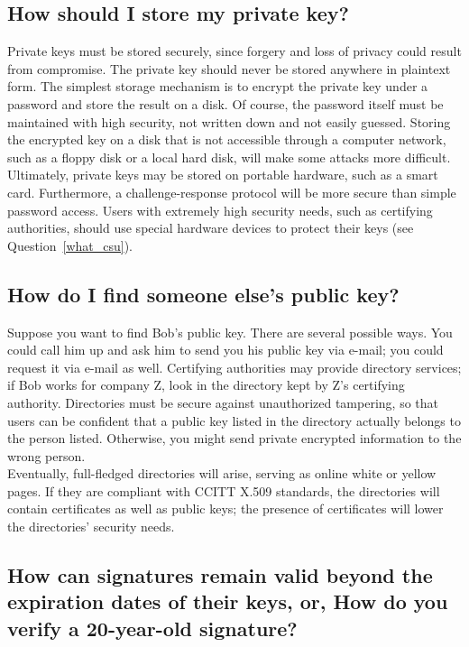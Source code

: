 \subsection{How should I store my private key?}
\label{how_stor}

Private keys must be stored securely, since forgery and loss of privacy
could result from compromise. The private key should never be stored
anywhere in plaintext form. The simplest storage mechanism is to
encrypt the private key under a password and store the result on a
disk. Of course, the password itself must be maintained with high
security, not written down and not easily guessed. Storing the
encrypted key on a disk that is not accessible through a computer
network, such as a floppy disk or a local hard disk, will make some
attacks more difficult. Ultimately, private keys may be stored on
portable hardware, such as a smart card. Furthermore, a
challenge-response protocol will be more secure than simple password
access. Users with extremely high security needs, such as certifying
authorities, should use special hardware devices to protect their keys
(see Question~\ref{what_csu}).

\subsection{How do I find someone else's public key?}

Suppose you want to find Bob's public key. There are several possible
ways. You could call him up and ask him to send you his public key via
e-mail; you could request it via e-mail as well. Certifying authorities
may provide directory services; if Bob works for company Z, look in the
directory kept by Z's certifying authority. Directories must be secure
against unauthorized tampering, so that users can be confident that a
public key listed in the directory actually belongs to the person
listed. Otherwise, you might send private encrypted information to the
wrong person.\\

Eventually, full-fledged directories will arise, serving as online
white or yellow pages. If they are compliant with CCITT X.509
standards, the directories will contain certificates as well as public
keys; the presence of certificates will lower the directories' security
needs.

\subsection{How can signatures remain valid beyond the expiration dates of
their keys, or, How do you verify a 20-year-old signature?}
\label{how_sig_old}


